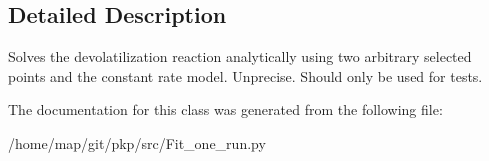 \subsection{\-Detailed \-Description}
\begin{DoxyVerb}Solves the devolatilization reaction analytically using two arbitrary selected points and the constant rate model. Unprecise. Should only be used for tests.\end{DoxyVerb}
 

\-The documentation for this class was generated from the following file\-:\begin{DoxyCompactItemize}
\item 
/home/map/git/pkp/src/\-Fit\-\_\-one\-\_\-run.\-py\end{DoxyCompactItemize}
